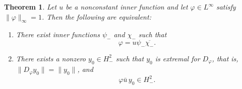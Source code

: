 \documentclass[12pt]{amsart}
\newtheorem{theorem}{Theorem}[section]
\theoremstyle{definition}
\theoremstyle{remark}
\newcommand{\vp}{\varphi}
\numberwithin{equation}{section}
\begin{document}
\begin{theorem}\label{thm:coanalytic-Dphi}
Let $u$ be a nonconstant inner function and let $\vp\in L^\infty$ satisfy $\|\vp\|_\infty=1$. Then the following are equivalent:
\begin{enumerate}
\item\label{coanalytic-Cu-1}
There exist inner functions $\psi_{-}$ and $\chi_{-}$ such that
\begin{equation}\label{eq:coanalytic-factor-phi}
\vp=u\psi_{-}\overline{\chi_{-}}.
\end{equation}
		
\item\label{coanalytic-Cu-2}
There exists a nonzero $y_0\in H^2_{-}$ such that $y_0$ is extremal for $D_\vp$, that is, $\|D_\vp y_0\|=\|y_0\|$, and
\begin{equation}\label{eq:extracondition-2}
\vp\bar{u}\,y_0\in H^2_{-}.
\end{equation}
\end{enumerate}
\end{theorem}
\end{document}

